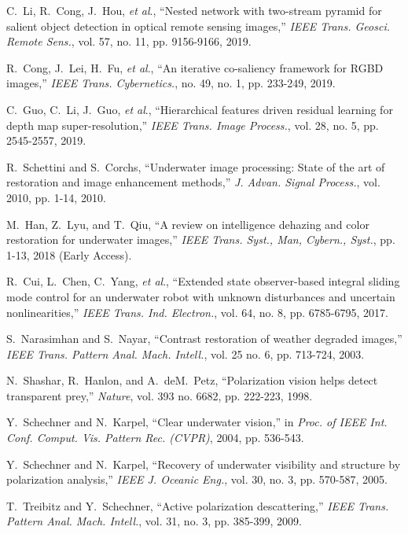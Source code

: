 \documentclass[journal]{IEEEtran}
\newcommand{\etal}{\textit{et al}.}
\begin{document}
\begin{thebibliography}{20}
C.~Li, R.~Cong, J.~Hou, \etal, ``Nested network with two-stream pyramid for salient object detection in optical remote sensing images,'' \emph{IEEE Trans. Geosci. Remote Sens.}, vol. 57, no. 11, pp. 9156-9166, 2019.

R.~Cong, J.~Lei, H.~Fu, \etal, ``An iterative co-saliency framework for RGBD images,'' \emph{IEEE Trans. Cybernetics.}, no. 49, no. 1, pp. 233-249, 2019.

C.~Guo, C.~Li, J.~Guo, \etal, ``Hierarchical features driven residual learning for depth map super-resolution,'' \emph{IEEE Trans. Image Process.}, vol. 28, no. 5, pp. 2545-2557, 2019.

R.~Schettini and S.~Corchs, ``Underwater image processing: State of the art of restoration and image enhancement methods,'' \emph{J. Advan. Signal Process.}, vol. 2010, pp. 1-14, 2010.

M.~Han, Z.~Lyu, and T.~Qiu, ``A review on intelligence dehazing and color restoration for underwater images,'' \emph{IEEE Trans. Syst., Man, Cybern., Syst.}, pp. 1-13, 2018 (Early Access).

R.~Cui, L.~Chen, C.~Yang, \etal, ``Extended state observer-based integral sliding mode control for an underwater robot with unknown disturbances and uncertain nonlinearities,'' \emph{IEEE Trans. Ind. Electron.}, vol. 64, no. 8, pp. 6785-6795, 2017.

S.~Narasimhan and S.~Nayar, ``Contrast restoration of weather degraded images,'' \emph{IEEE Trans. Pattern Anal. Mach. Intell.}, vol. 25 no. 6, pp. 713-724, 2003.

N.~Shashar, R.~Hanlon, and A.~deM.~Petz, ``Polarization vision helps detect transparent prey,'' \emph{Nature}, vol. 393 no. 6682, pp. 222-223, 1998.

Y.~Schechner and N.~Karpel, ``Clear underwater vision,'' in \emph{Proc. of IEEE Int. Conf. Comput. Vis. Pattern Rec. (CVPR)}, 2004, pp. 536-543.

Y.~Schechner and N.~Karpel, ``Recovery of underwater visibility and structure by polarization analysis,'' \emph{IEEE J. Oceanic Eng.}, vol. 30, no. 3, pp. 570-587, 2005.

T.~Treibitz and Y.~Schechner, ``Active polarization descattering,'' \emph{IEEE Trans. Pattern Anal. Mach. Intell.}, vol. 31, no. 3, pp. 385-399, 2009.


\end{thebibliography}
\end{document}
